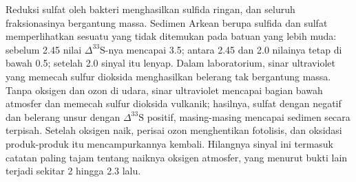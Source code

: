 Reduksi sulfat oleh bakteri menghasilkan sulfida ringan, dan seluruh fraksionasinya
bergantung massa. Sedimen Arkean berupa sulfida dan sulfat memperlihatkan sesuatu yang
tidak ditemukan pada batuan yang lebih muda: sebelum \qty{2.45}{\Ga} nilai $\Delta^{33}\mathrm S$-nya mencapai
\qty{3.5}{\permil}; antara 2.45 dan \qty{2.0}{\Ga} nilainya tetap di bawah
\qty{0.5}{\permil}; setelah \qty{2.0}{\Ga} sinyal itu lenyap. Dalam laboratorium,
sinar ultraviolet yang memecah sulfur dioksida menghasilkan belerang tak bergantung massa.
Tanpa oksigen dan ozon di udara, sinar ultraviolet mencapai bagian bawah
atmosfer dan memecah sulfur dioksida vulkanik; hasilnya, sulfat dengan
negatif dan belerang unsur dengan $\Delta^{33}\mathrm S$ positif, masing-masing
mencapai sedimen secara terpisah. Setelah oksigen naik, perisai ozon menghentikan
fotolisis, dan oksidasi produk-produk itu mencampurkannya kembali. Hilangnya
sinyal ini termasuk catatan paling tajam tentang naiknya
oksigen atmosfer, yang menurut bukti lain terjadi sekitar 2 hingga \qty{2.3}{\Ga}
lalu.

\begin{omfigure}

\par{}\label{fig:b3:stable-isotopes:three-isotope}
\end{omfigure}

